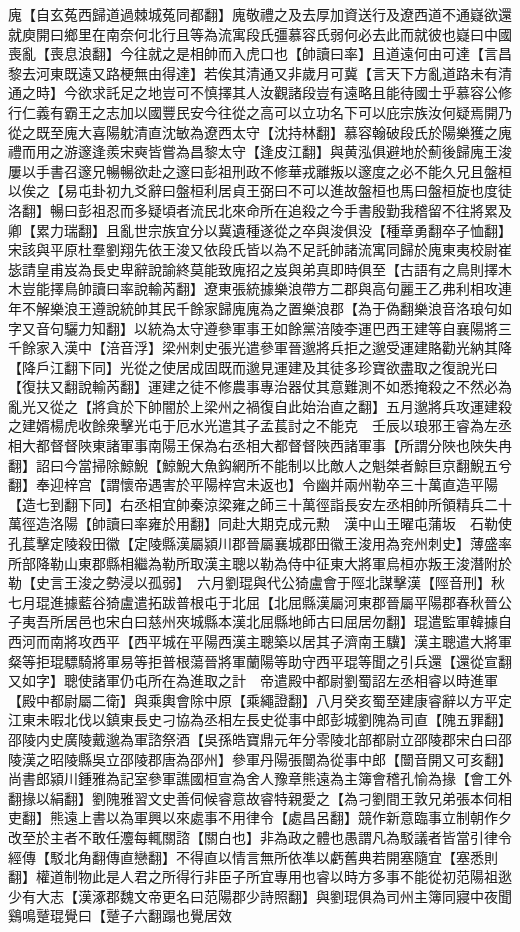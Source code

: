 廆【自玄菟西歸道過棘城菟同都翻】廆敬禮之及去厚加資送行及遼西道不通嶷欲還就庾開曰鄉里在南奈何北行且等為流寓段氏彊慕容氏弱何必去此而就彼也嶷曰中國喪亂【喪息浪翻】今往就之是相帥而入虎口也【帥讀曰率】且道遠何由可達【言昌黎去河東既遠又路梗無由得達】若俟其清通又非歲月可冀【言天下方亂道路未有清通之時】今欲求託足之地豈可不慎擇其人汝觀諸段豈有遠略且能待國士乎慕容公修行仁義有霸王之志加以國豐民安今往從之高可以立功名下可以庇宗族汝何疑焉開乃從之既至廆大喜陽躭清直沈敏為遼西太守【沈持林翻】慕容翰破段氏於陽樂獲之廆禮而用之游邃逢羨宋奭皆嘗為昌黎太守【逢皮江翻】與黄泓俱避地於薊後歸廆王浚屢以手書召邃兄暢暢欲赴之邃曰彭祖刑政不修華戎離叛以邃度之必不能久兄且盤桓以俟之【易屯卦初九爻辭曰盤桓利居貞王弼曰不可以進故盤桓也馬曰盤桓旋也度徒洛翻】暢曰彭祖忍而多疑頃者流民北來命所在追殺之今手書殷勤我稽留不往將累及卿【累力瑞翻】且亂世宗族宜分以冀遺種遂從之卒與浚俱没【種章勇翻卒子恤翻】宋該與平原杜羣劉翔先依王浚又依段氏皆以為不足託帥諸流寓同歸於廆東夷校尉崔毖請皇甫岌為長史卑辭說諭終莫能致廆招之岌與弟真即時俱至【古語有之鳥則擇木木豈能擇鳥帥讀曰率說輸芮翻】遼東張統據樂浪帶方二郡與高句麗王乙弗利相攻連年不解樂浪王遵說統帥其民千餘家歸廆廆為之置樂浪郡【為于偽翻樂浪音洛琅句如字又音句驪力知翻】以統為太守遵參軍事王如餘黨涪陵李運巴西王建等自襄陽將三千餘家入漢中【涪音浮】梁州刺史張光遣參軍晉邈將兵拒之邈受運建賂勸光納其降【降戶江翻下同】光從之使居成固既而邈見運建及其徒多珍寶欲盡取之復說光曰【復扶又翻說輸芮翻】運建之徒不修農事專治器仗其意難測不如悉掩殺之不然必為亂光又從之【將貪於下帥闇於上梁州之禍復自此始治直之翻】五月邈將兵攻運建殺之建婿楊虎收餘衆擊光屯于厄水光遣其子孟萇討之不能克　壬辰以琅邪王睿為左丞相大都督督陜東諸軍事南陽王保為右丞相大都督督陜西諸軍事【所謂分陜也陜失冉翻】詔曰今當掃除鯨鯢【鯨鯢大魚鈎網所不能制以比敵人之魁桀者鯨巨京翻鯢五兮翻】奉迎梓宫【謂懷帝遇害於平陽梓宫未返也】令幽并兩州勒卒三十萬直造平陽【造七到翻下同】右丞相宜帥秦涼梁雍之師三十萬徑詣長安左丞相帥所領精兵二十萬徑造洛陽【帥讀曰率雍於用翻】同赴大期克成元勲　漢中山王曜屯蒲坂　石勒使孔萇擊定陵殺田徽【定陵縣漢屬潁川郡晉屬襄城郡田徽王浚用為兖州刺史】薄盛率所部降勒山東郡縣相繼為勒所取漢主聰以勒為侍中征東大將軍烏桓亦叛王浚潛附於勒【史言王浚之勢浸以孤弱】　六月劉琨與代公猗盧會于陘北謀擊漢【陘音刑】秋七月琨進據藍谷猗盧遣拓跋普根屯于北屈【北屈縣漢屬河東郡晉屬平陽郡春秋晉公子夷吾所居邑也宋白曰慈州夾城縣本漢北屈縣地師古曰屈居勿翻】琨遣監軍韓據自西河而南將攻西平【西平城在平陽西漢主聰築以居其子濟南王驥】漢主聰遣大將軍粲等拒琨驃騎將軍易等拒普根蕩晉將軍蘭陽等助守西平琨等聞之引兵還【還從宣翻又如字】聰使諸軍仍屯所在為進取之計　帝遣殿中都尉劉蜀詔左丞相睿以時進軍【殿中都尉屬二衛】與乘輿會除中原【乘繩證翻】八月癸亥蜀至建康睿辭以方平定江東未暇北伐以鎮東長史刁協為丞相左長史從事中郎彭城劉隗為司直【隗五罪翻】邵陵内史廣陵戴邈為軍諮祭酒【吳孫皓寶鼎元年分零陵北部都尉立邵陵郡宋白曰邵陵漢之昭陵縣吳立邵陵郡唐為邵州】參軍丹陽張闓為從事中郎【闓音開又可亥翻】尚書郎潁川鍾雅為記室參軍譙國桓宣為舍人豫章熊遠為主簿會稽孔愉為掾【會工外翻掾以絹翻】劉隗雅習文史善伺候睿意故睿特親愛之【為刁劉間王敦兄弟張本伺相吏翻】熊遠上書以為軍興以來處事不用律令【處昌呂翻】競作新意臨事立制朝作夕改至於主者不敢任灋每輒關諮【關白也】非為政之體也愚謂凡為駁議者皆當引律令經傳【駁北角翻傳直戀翻】不得直以情言無所依凖以虧舊典若開塞隨宜【塞悉則翻】權道制物此是人君之所得行非臣子所宜專用也睿以時方多事不能從初范陽祖逖少有大志【漢涿郡魏文帝更名曰范陽郡少詩照翻】與劉琨俱為司州主簿同寢中夜聞鷄鳴蹵琨覺曰【蹵子六翻蹋也覺居效